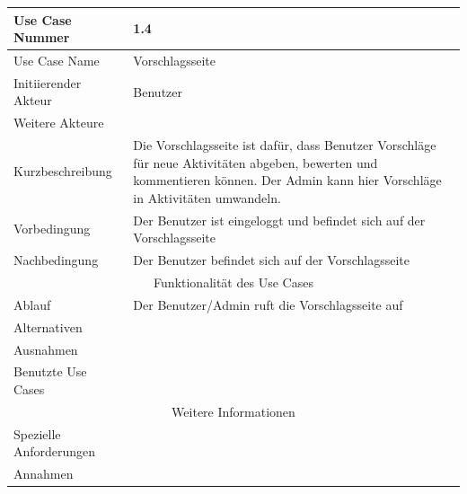 \documentclass[10pt,a4paper]{article}
\begin{document}
\begin{tabularx}{\textwidth}{|l|X|}
		\hline Use Case Nummer & 1.4\\ 
		\hline Use Case Name & Vorschlagsseite \\ 
		\hline Initiierender Akteur & Benutzer \\
		\hline Weitere Akteure & \\
		\hline Kurzbeschreibung & Die Vorschlagsseite ist dafür, dass Benutzer Vorschl\"age für neue Aktivit\"aten abgeben, bewerten und kommentieren k\"onnen. Der Admin kann hier Vorschl\"age in Aktivit\"aten umwandeln.\\
		\hline Vorbedingung & Der Benutzer ist eingeloggt und befindet sich auf der Vorschlagsseite \\
		\hline Nachbedingung & Der Benutzer befindet sich auf der Vorschlagsseite \\
		\hline \multicolumn{2}{|c|}{Funktionalität des Use Cases}\\
		\hline Ablauf & Der Benutzer/Admin ruft die Vorschlagsseite auf \\
		\hline Alternativen & \\
		\hline Ausnahmen & \\
		\hline Benutzte Use Cases & \\
		\hline \multicolumn{2}{|c|}{Weitere Informationen} \\
		\hline Spezielle Anforderungen & \\
		\hline Annahmen & \\
		\hline
	\end{tabularx}
\end{document}
